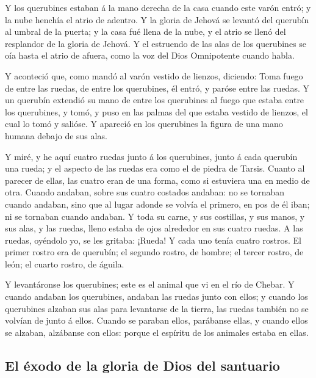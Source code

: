  Y los querubines estaban á la mano derecha de la casa
cuando este varón entró; y la nube henchía el atrio de adentro.
 Y la gloria de Jehová se levantó del querubín al umbral
de la puerta; y la casa fué llena de la nube, y el atrio se llenó del
resplandor de la gloria de Jehová.  Y el estruendo de las
alas de los querubines se oía hasta el atrio de afuera, como la voz del
Dios Omnipotente cuando habla.

 Y aconteció que, como mandó al varón vestido de lienzos,
diciendo: Toma fuego de entre las ruedas, de entre los querubines, él
entró, y paróse entre las ruedas.  Y un querubín extendió
su mano de entre los querubines al fuego que estaba entre los
querubines, y tomó, y puso en las palmas del que estaba vestido de
lienzos, el cual lo tomó y salióse.  Y apareció en los
querubines la figura de una mano humana debajo de sus alas.

 Y miré, y he aquí cuatro ruedas junto á los querubines,
junto á cada querubín una rueda; y el aspecto de las ruedas era como el
de piedra de Tarsis.  Cuanto al parecer de ellas, las
cuatro eran de una forma, como si estuviera una en medio de otra.
 Cuando andaban, sobre sus cuatro costados andaban: no se
tornaban cuando andaban, sino que al lugar adonde se volvía el primero,
en pos de él iban; ni se tornaban cuando andaban.  Y toda
su carne, y sus costillas, y sus manos, y sus alas, y las ruedas, lleno
estaba de ojos alrededor en sus cuatro ruedas.  A las
ruedas, oyéndolo yo, se les gritaba: ¡Rueda!  Y cada uno
tenía cuatro rostros. El primer rostro era de querubín; el segundo
rostro, de hombre; el tercer rostro, de león; el cuarto rostro, de
águila.

 Y levantáronse los querubines; este es el animal que vi
en el río de Chebar.  Y cuando andaban los querubines,
andaban las ruedas junto con ellos; y cuando los querubines alzaban sus
alas para levantarse de la tierra, las ruedas también no se volvían de
junto á ellos.  Cuando se paraban ellos, parábanse ellas,
y cuando ellos se alzaban, alzábanse con ellos: porque el espíritu de
los animales estaba en ellas.

\hypertarget{el-uxe9xodo-de-la-gloria-de-dios-del-santuario}{%
\subsection{El éxodo de la gloria de Dios del
santuario}\label{el-uxe9xodo-de-la-gloria-de-dios-del-santuario}}


